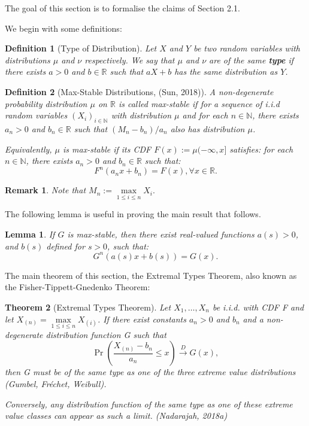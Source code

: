 \documentclass{article}
\newtheorem{theorem}{Theorem}[section]
\newtheorem{lemma}[theorem]{Lemma}
\newtheorem{definition}{Definition}[section]
\newtheorem*{remark}{Remark}
\begin{document}


The goal of this section is to formalise the claims of Section 2.1. 

We begin with some definitions:

\begin{definition}[Type of Distribution]
Let $X$ and $Y$ be two random variables with distributions $\mu$ and $\nu$ respectively. We say that $\mu$ and $\nu$ are of the same \textbf{type} if there exists $a > 0$ and $b \in \mathbb{R}$ such that $aX + b$ has the same distribution as $Y$.
\end{definition}

\begin{definition}[Max-Stable Distributions, (Sun, 2018)]
A non-degenerate probability distribution $\mu$ on $\mathbb{R}$ is called max-stable if for a sequence of i.i.d random variables $(X_{i})_{i\in\mathbb{N}}$ with distribution $\mu$ and for each $n\in\mathbb{N}$, there exists $a_n > 0$ and $b_n \in\mathbb{R}$ such that $(M_{n} - b_{n})/a_{n}$ also has distribution $\mu$.

Equivalently, $\mu$ is max-stable if its CDF $F(x):= \mu(-\infty,x]$ satisfies: for each $n\in\mathbb{N}$, there exists $a_{n} > 0$ and $b_n \in \mathbb{R}$ such that:
\[F^{n}(a_n x + b_n) = F(x), \forall x \in \mathbb{R}. \]
\end{definition}

\begin{remark}
Note that $M_n := \max\limits_{1 \leq i \leq n} X_i.$
\end{remark}

The following lemma is useful in proving the main result that follows.

\begin{lemma}
If $G$ is max-stable, then there exist real-valued functions $a(s) > 0$, and $b(s)$ defined for $s>0$, such that:
\[ G^{n}(a(s)x + b(s)) = G(x).\]
\end{lemma}

The main theorem of this section, the Extremal Types Theorem, also known as the Fisher-Tippett-Gnedenko Theorem:

\begin{theorem}[Extremal Types Theorem]
Let $X_1,\ldots,X_n$ be i.i.d. with CDF F and let $X_{(n)} = \max\limits_{1 \leq i \leq n} X_{(i)}$. If there exist constants $a_n > 0 $ and $b_n$ and a non-degenerate distribution function G such that
$$\Pr \left( \frac{X_{(n)}-b_n}{a_n} \leq x \right) \xrightarrow{D}G(x), $$
then G must be of the same type as one of the three extreme value distributions (Gumbel, Fr\'echet, Weibull).

Conversely, any distribution function of the same type as one of these extreme value
classes can appear as such a limit. (Nadarajah, 2018a)
\end{theorem}
\end{document}
